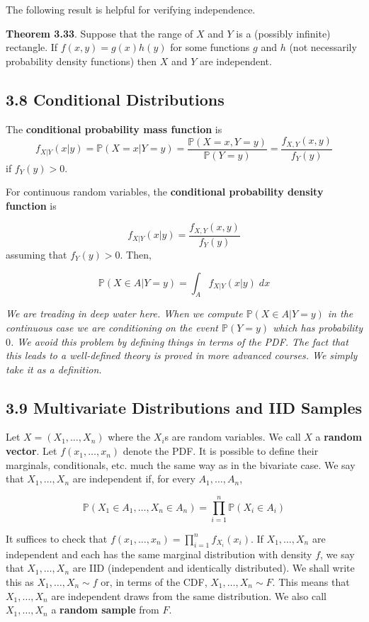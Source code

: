 The following result is helpful for verifying independence.

\textbf{Theorem 3.33}. Suppose that the range of \(X\) and \(Y\) is a (possibly infinite) rectangle. If \(f(x, y) = g(x) h(y)\) for some functions \(g\) and \(h\) (not necessarily probability density functions) then \(X\) and \(Y\) are independent.

\subsection*{3.8 Conditional Distributions}\label{conditional-distributions}

The \textbf{conditional probability mass function} is
\[
f_{X | Y}(x | y) = \mathbb{P}(X = x | Y = y) = \frac{\mathbb{P}(X = x, Y = y)}{\mathbb{P}(Y = y)} = \frac{f_{X, Y}(x, y)}{f_Y(y)}
\]
if \(f_Y(y) > 0\).

For continuous random variables, the \textbf{conditional probability density function} is

\[
f_{X | Y}(x | y) = \frac{f_{X, Y}(x, y)}{f_Y(y)}
\]
assuming that \(f_Y(y) > 0\). Then,

\[
\mathbb{P}(X \in A | Y = y) = \int_A f_{X | Y}(x | y) \; dx
\]

\emph{We are treading in deep water here. When we compute \(\mathbb{P}(X \in A | Y = y)\) in the continuous case we are conditioning on the event \(\mathbb{P}(Y = y)\) which has probability $0$. We avoid this problem by defining things in terms of the PDF. The fact that this leads to a well-defined theory is proved in more advanced courses. We simply take it as a definition.}

\subsection*{3.9 Multivariate Distributions and IID Samples}\label{multivariate-distributions-and-iid-samples}

Let \(X = (X_{1}, \dots, X_{n})\) where the \(X_{i}\)s are random variables. We call \(X\) a \textbf{random vector}. Let \(f(x_{1}, \dots, x_{n})\) denote the PDF. It is possible to define their marginals, conditionals, etc. much the same way as in the bivariate case. We say that \(X_{1}, \dots, X_{n}\) are independent if, for every \(A_{1}, \dots, A_{n}\),

\[
\mathbb{P}(X_{1} \in A_{1}, \dots, X_{n} \in A_{n}) = \prod_{i=1}^{n} \mathbb{P}(X_{i} \in A_{i})
\]

It suffices to check that \(f(x_{1}, \dots, x_{n}) = \prod_{i=1}^{n} f_{X_{i}}(x_{i})\). If \(X_{1}, \dots, X_{n}\) are independent and each has the same marginal distribution with density \(f\), we say that \(X_{1}, \dots, X_{n}\) are IID (independent and identically distributed). We shall write this as \(X_{1}, \dots, X_{n} \sim f\) or, in terms of the CDF, \(X_{1}, \dots, X_{n} \sim F\). This means that \(X_{1}, \dots, X_{n}\) are independent draws from the same distribution. We also call \(X_{1}, \dots, X_{n}\) a \textbf{random sample} from \(F\).

